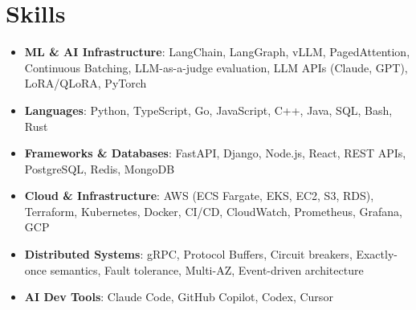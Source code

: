 \documentclass[letterpaper,11pt]{article}
\newcommand{\resumeSubHeadingListStart}{\begin{itemize}[leftmargin=0.15in, label={}]}
\newcommand{\resumeSubHeadingListEnd}{\end{itemize}}
\newcommand{\resumeSkillHeading}[2]{%
  \item\small{\textbf{#1}: #2 \vspace{-9pt}}%
}
\begin{document}
\section{Skills}
  \resumeSubHeadingListStart
    \resumeSkillHeading{ML \& AI Infrastructure}{LangChain, LangGraph, vLLM, PagedAttention, Continuous Batching, LLM-as-a-judge evaluation, LLM APIs (Claude, GPT), LoRA/QLoRA, PyTorch}
    \resumeSkillHeading{Languages}{Python, TypeScript, Go, JavaScript, C++, Java, SQL, Bash, Rust}
    \resumeSkillHeading{Frameworks \& Databases}{FastAPI, Django, Node.js, React, REST APIs, PostgreSQL, Redis, MongoDB}
    \resumeSkillHeading{Cloud \& Infrastructure}{AWS (ECS Fargate, EKS, EC2, S3, RDS), Terraform, Kubernetes, Docker, CI/CD, CloudWatch, Prometheus, Grafana, GCP}
    \resumeSkillHeading{Distributed Systems}{gRPC, Protocol Buffers, Circuit breakers, Exactly-once semantics, Fault tolerance, Multi-AZ, Event-driven architecture}
    \resumeSkillHeading{AI Dev Tools}{Claude Code, GitHub Copilot, Codex, Cursor}
  \resumeSubHeadingListEnd
\end{document}
